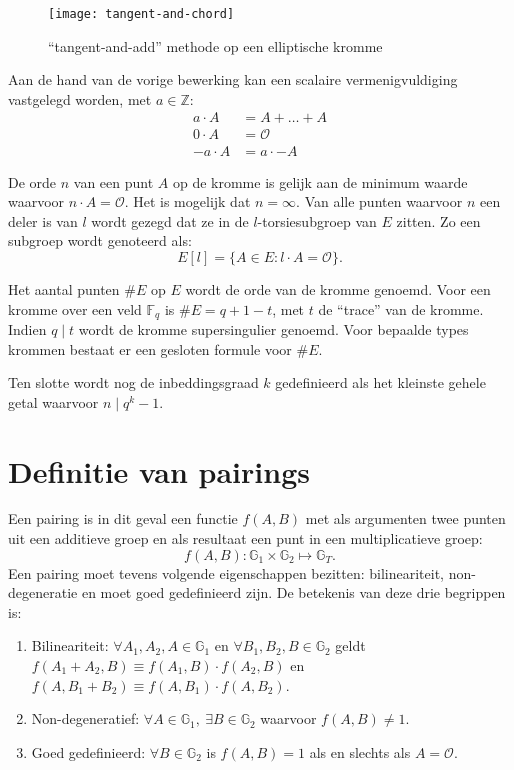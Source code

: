 \begin{figure}[h]
	\centering
		\texttt{[image: tangent-and-chord]}
		\caption{``tangent-and-add'' methode op een elliptische kromme\label{figuur-pairings-tangent-and-chord}}
\end{figure}

Aan de hand van de vorige bewerking kan een scalaire vermenigvuldiging vastgelegd worden, met $a \in \mathbb{Z}$:
\[\begin{aligned}
a \cdot A	&= A + \ldots + A\\
0 \cdot A	&= \mathcal{O}\\
-a \cdot A	&= a \cdot -A
\end{aligned}\]

De orde $n$ van een punt $A$ op de kromme is gelijk aan de minimum waarde waarvoor $n \cdot A = \mathcal{O}$. Het is mogelijk dat $n = \infty$. Van alle punten waarvoor $n$ een deler is van $l$ wordt gezegd dat ze in de $l$-torsiesubgroep van $E$ zitten. Zo een subgroep wordt genoteerd als:
\[E[l] = \{ A \in E : l \cdot A = \mathcal{O} \}.\]

Het aantal punten $\#E$ op $E$ wordt de orde van de kromme genoemd. Voor een kromme over een veld $\mathbb{F}_q$ is $\#E = q + 1 - t$, met $t$ de ``trace'' van de kromme. Indien $q \mid t$ wordt de kromme supersingulier genoemd. Voor bepaalde types krommen bestaat er een gesloten formule voor $\#E$.

Ten slotte wordt nog de inbeddingsgraad $k$ gedefinieerd als het kleinste gehele getal waarvoor $n \mid q^k - 1$.

\section{Definitie van pairings}

Een pairing is in dit geval een functie $f(A, B)$ met als argumenten twee punten uit een additieve groep en als resultaat een punt in een multiplicatieve groep:
\[f(A, B): \mathbb{G}_1 \times \mathbb{G}_2 \mapsto \mathbb{G}_T.\]
Een pairing moet tevens volgende eigenschappen bezitten: bilineariteit, non-degeneratie en moet goed gedefinieerd zijn. De betekenis van deze drie begrippen is:

\begin{enumerate}
	\item Bilineariteit: $\forall A_1, A_2, A \in \mathbb{G}_1$ en $\forall B_1, B_2, B \in \mathbb{G}_2$ geldt $f(A_1 + A_2, B) \equiv f(A_1, B) \cdot f(A_2, B)$ en $f(A, B_1 + B_2) \equiv f(A, B_1) \cdot f(A, B_2)$.

	\item Non-degeneratief: $\forall A \in \mathbb{G}_1, \: \exists B \in \mathbb{G}_2$ waarvoor $f(A, B) \neq 1$.

	\item Goed gedefinieerd: $\forall B \in \mathbb{G}_2$ is $f(A, B) = 1$ als en slechts als $A = \mathcal{O}$.
\end{enumerate}

